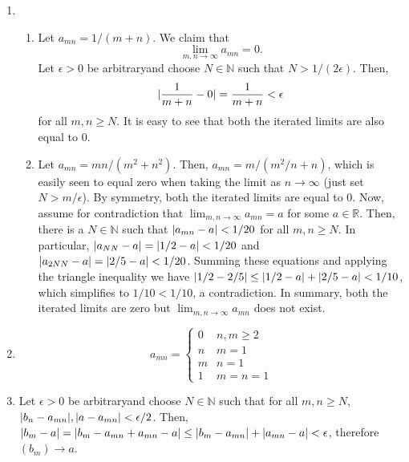 \documentclass{article}
\DeclarePairedDelimiter\abs{\lvert}{\rvert}
\newcommand{\N}{\mathbb{N}}
\newcommand{\R}{\mathbb{R}}
\newcommand{\ra}{\rightarrow}
\newcommand{\lep}[1][L]{#1et $\epsilon > 0$ be arbitrary}
\begin{document}
\begin{enumerate}
\begin{enumerate}
	\item \begin{enumerate}
	\item Let $a_{mn} = 1/(m+n)$. We claim that \begin{equation*}
	      \lim_{m, n \ra \infty} a_{mn} = 0.
	\end{equation*} \lep \space and choose $N \in \N$ such that $N > 1/(2\epsilon)$. Then, \begin{equation*}
	\abs{\frac{1}{m+n} - 0} = \frac{1}{m+n} < \epsilon
	\end{equation*} for all $m,n \geq N$. It is easy to see that both the iterated limits are also equal to $0$.
			        
	\item Let $a_{mn}= mn/(m^2+n^2)$. Then, $a_{mn} = m/(m^2/n+n)$, which is easily seen to equal zero when taking the limit as $n \ra \infty$ (just set $N > m/\epsilon$). By symmetry, both the iterated limits are equal to $0$. Now, assume for contradiction that $\lim_{m,n \ra \infty} a_{mn}= a$ for some $a \in \R$. Then, there is a $N \in \N$ such that $\abs{a_{mn} - a}  < 1/20$ for all $m,n \geq N$. In particular, $\abs{a_{NN}-a} = \abs{1/2-a} < 1/20$ and $\abs{a_{2N N} - a} = \abs{2/5-a} < 1/20$. Summing these equations and applying the triangle inequality we have $\abs{1/2-2/5}\leq \abs{1/2-a}+\abs{2/5-a}<1/10$, which simplifies to $1/10 < 1/10$, a contradiction. In summary, both the iterated limits are zero but $\lim_{m,n \ra \infty} a_{mn}$ does not exist.
\end{enumerate}
	    
    \item \begin{equation*}
    a_{mn} = \begin{cases}
    0 & n,m \geq 2 \\
    n & m = 1 \\
    m & n = 1 \\
    1 & m = n = 1
    \end{cases}
    \end{equation*}
    	        
    \item \lep \space and choose $N \in \N$ such that for all $m,n \geq N$, $\abs{b_n-a_{mn}}, \abs{a-a_{mn}} < \epsilon/2$. Then, $\abs{b_m-a} = \abs{b_m-a_{mn} + a_{mn} - a} \leq \abs{b_m-a_{mn}} + \abs{a_{mn}-a} < \epsilon$, therefore $(b_m) \ra a$.
    \end{enumerate}
    	

\end{enumerate}
\end{document}
